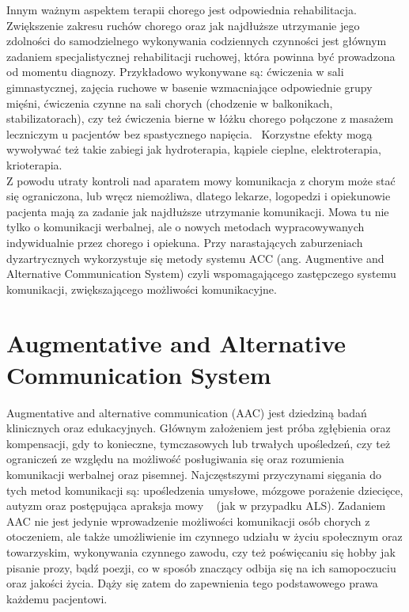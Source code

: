 \documentclass[twoside,a4paper]{book}
\begin{document}
Innym ważnym aspektem terapii chorego jest odpowiednia rehabilitacja. Zwiększenie zakresu ruchów chorego oraz jak najdłuższe utrzymanie jego zdolności do samodzielnego wykonywania codziennych czynności jest głównym zadaniem specjalistycznej rehabilitacji ruchowej, która powinna być prowadzona od momentu diagnozy. Przykładowo wykonywane są: ćwiczenia w sali gimnastycznej, zajęcia ruchowe w basenie wzmacniające odpowiednie grupy mięśni, ćwiczenia czynne na sali chorych (chodzenie w balkonikach, stabilizatorach), czy też ćwiczenia bierne w łóżku chorego połączone z masażem leczniczym u pacjentów bez spastycznego napięcia.~\cite{alsAdamek} Korzystne efekty mogą wywoływać też takie zabiegi jak hydroterapia, kąpiele cieplne, elektroterapia, krioterapia. ~\cite{poradnik}\\
Z powodu utraty kontroli nad aparatem mowy komunikacja z chorym może stać się ograniczona, lub wręcz niemożliwa, dlatego lekarze, logopedzi i opiekunowie pacjenta mają za zadanie jak najdłuższe utrzymanie komunikacji.  Mowa tu nie tylko o komunikacji werbalnej, ale o nowych metodach wypracowywanych  indywidualnie przez chorego i opiekuna. 
Przy  narastających  zaburzeniach  dyzartrycznych  wykorzystuje  się metody  systemu  ACC  (ang.  Augmentive  and  Alternative  Communication  System)  czyli  wspomagającego  zastępczego  systemu  komunikacji,  zwiększającego możliwości komunikacyjne.~\cite{alsAdamek}

\section{Augmentative and Alternative Communication System}


Augmentative and alternative communication (AAC) jest dziedziną badań klinicznych oraz edukacyjnych. Głównym założeniem jest próba zgłębienia oraz kompensacji, gdy to konieczne, tymczasowych lub trwałych upośledzeń, czy też ograniczeń ze względu na możliwość posługiwania się oraz rozumienia komunikacji werbalnej oraz pisemnej.  Najczęstszymi przyczynami sięgania do tych metod komunikacji są: upośledzenia umysłowe, mózgowe porażenie dziecięce, autyzm oraz postępująca apraksja mowy ~\cite{augmentative} (jak w przypadku ALS). Zadaniem AAC nie jest jedynie wprowadzenie możliwości komunikacji osób chorych z otoczeniem, ale także umożliwienie im czynnego udziału w życiu społecznym oraz towarzyskim, wykonywania czynnego zawodu, czy też poświęcaniu się hobby jak pisanie prozy, bądź poezji, co w sposób znaczący odbija się na ich samopoczuciu oraz jakości życia. Dąży się zatem do zapewnienia tego podstawowego prawa każdemu pacjentowi. 
\end{document}
